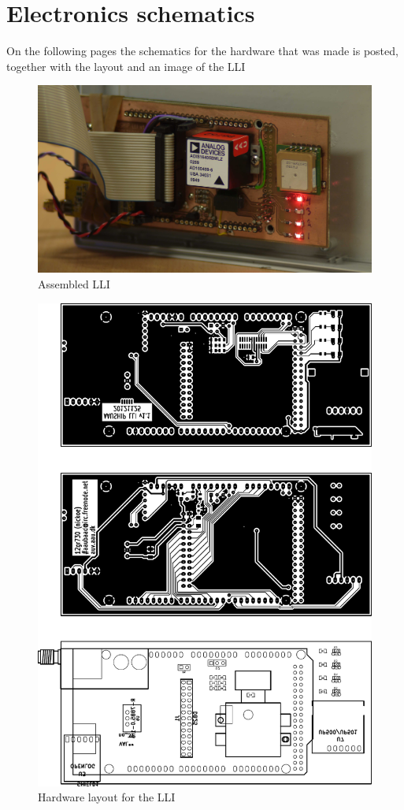 \chapter{Electronics schematics}
\label{chap:schema}

\noindent On the following pages the schematics for the hardware that was made is posted, together with the layout and an image of the LLI


\begin{figure}[h]
\centering
\includegraphics[width=\textwidth]{Pictures/lli}
\caption{Assembled LLI}
\label{fig:lliasm}
\end{figure}
\newpage

\begin{figure}[h!]
\centering
\includegraphics{img/lli-hw}
\caption{Hardware layout for the LLI}
\label{fig:lli-hw}
\end{figure}



\label{appendices:bow thruster schematic}

